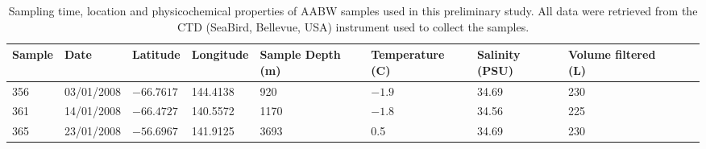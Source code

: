 \begin{table}
\caption[\ac{AABW} samples used in the preliminary analysis]{Sampling time, location and physicochemical properties of \ac{AABW} samples used in this preliminary study.
All data were retrieved from the \ac{CTD} (SeaBird, Bellevue, USA) instrument used to collect the samples.}
\label{tab:deepsamples}
\smallskip
\begin{tabularx}{\textwidth}{llllXXXXXX}
\toprule
\textbf{Sample} & \textbf{Date} & \textbf{Latitude} & \textbf{Longitude} & \textbf{Sample Depth (m)} & \textbf{Temperature (\textdegree{}C)} & \textbf{Salinity (PSU)} & \textbf{Volume \linebreak filtered (L)}\\
\midrule

356 & 03/01/2008 & $-66.7617$ & 144.4138 & 920 & $-1.9$ & 34.69 & 230\\
361 & 14/01/2008 & $-66.4727$ & 140.5572 & 1170 & $-1.8$ & 34.56 & 225\\
365 & 23/01/2008 & $-56.6967$ & 141.9125 & 3693 & 0.5 & 34.69 & 230\\
\bottomrule
\end{tabularx}
\end{table}
